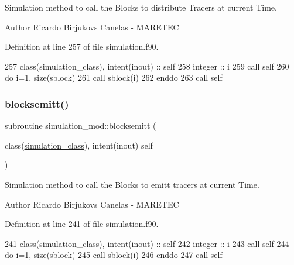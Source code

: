 Simulation method to call the Blocks to distribute Tracers at current Time. 

\begin{DoxyAuthor}{Author}
Ricardo Birjukovs Canelas -\/ M\+A\+R\+E\+T\+EC 
\end{DoxyAuthor}


Definition at line 257 of file simulation.\+f90.


\begin{DoxyCode}
257     \textcolor{keywordtype}{class}(simulation\_class), \textcolor{keywordtype}{intent(inout)} :: self
258     \textcolor{keywordtype}{integer} :: i
259     \textcolor{keyword}{call }self%
260     \textcolor{keywordflow}{do} i=1, \textcolor{keyword}{size}(sblock)
261         \textcolor{keyword}{call }sblock(i)%
262 \textcolor{keywordflow}{    enddo}
263     \textcolor{keyword}{call }self%
\end{DoxyCode}
\mbox{\label{namespacesimulation__mod_a13aa0745f4601e3f418143dab2f18276}} 
\subsubsection{\texorpdfstring{blocksemitt()}{blocksemitt()}}
{\footnotesize\ttfamily subroutine simulation\+\_\+mod\+::blocksemitt (\begin{DoxyParamCaption}\item[{class(\mbox{\hyperlink{structsimulation__mod_1_1simulation__class}{simulation\+\_\+class}}), intent(inout)}]{self }\end{DoxyParamCaption})\hspace{0.3cm}{\ttfamily [private]}}



Simulation method to call the Blocks to emitt tracers at current Time. 

\begin{DoxyAuthor}{Author}
Ricardo Birjukovs Canelas -\/ M\+A\+R\+E\+T\+EC 
\end{DoxyAuthor}


Definition at line 241 of file simulation.\+f90.


\begin{DoxyCode}
241     \textcolor{keywordtype}{class}(simulation\_class), \textcolor{keywordtype}{intent(inout)} :: self
242     \textcolor{keywordtype}{integer} :: i
243     \textcolor{keyword}{call }self%
244     \textcolor{keywordflow}{do} i=1, \textcolor{keyword}{size}(sblock)
245         \textcolor{keyword}{call }sblock(i)%
246 \textcolor{keywordflow}{    enddo}
247     \textcolor{keyword}{call }self%
\end{DoxyCode}
\mbox{\label{namespacesimulation__mod_ab2e7a1b0f131ab6fe40454d32cb3e24f}} 
